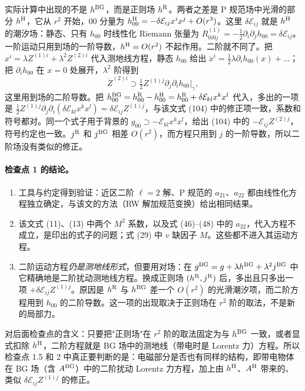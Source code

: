 \documentclass[11pt,a4paper]{ctexart}
\numberwithin{equation}{section}
\begin{document}
实际计算中出现的不是 $h^{\rm BG}$，而是正则场 $h^{\rm R}$。两者之差是 P 规范场中光滑的部分 $h^{\rm H}$，它从 $r^2$ 开始，$00$ 分量为 $h^{\rm H}_{00}=-\delta\mathcal E_{ij}x^ix^j+O(r^3)$。这里 $\delta\mathcal E_{ij}$ 就是 $h^{\rm H}$ 的潮汐场：静态、只有 $h_{00}$ 时线性化 Riemann 张量为 $R^{(1)}_{0i0j}=-\tfrac12\partial_i\partial_jh_{00}=\delta\mathcal E_{ij}$。一阶运动只用到场的一阶导数，$h^{\rm H}=O(r^2)$ 不起作用。二阶就不同了。把 $x^i=\lambda Z^{(1)i}+\lambda^2Z^{(2)i}$ 代入测地线方程，静态 $h_{00}$ 给出 $\ddot x^i=\tfrac12\lambda\partial_ih_{00}(x)+\dots$；把 $\partial_ih_{00}$ 在 $x=0$ 处展开，$\lambda^2$ 阶得到
\begin{equation*}
\ddot Z^{(2)i}\supset\tfrac12Z^{(1)j}\partial_j\partial_ih_{00}\big|_\gamma ,
\end{equation*}
这里用到场的二阶导数。把 $h^{\rm BG}_{00}=h^{\rm R}_{00}-h^{\rm H}_{00}=h^{\rm R}_{00}+\delta\mathcal E_{kl}x^kx^l$ 代入，多出的一项是 $\tfrac12Z^{(1)j}\partial_j\partial_i(\delta\mathcal E_{kl}x^kx^l)=\delta\mathcal E_{ij}Z^{(1)j}$，与该文式 (104) 中的修正项一致，系数和符号都对。同一个式子用于背景的 $g_{00}\supset-\mathcal E_{kl}x^kx^l$，给出 (104) 中的 $-\mathcal E_{ij}Z^{(2)j}$，符号约定也一致。$j^{\rm R}$ 和 $j^{\rm BG}$ 相差 $O(r^2)$，而方程只用到 $j$ 的一阶导数，所以二阶场没有类似的修正。

\paragraph{检查点 1 的结论。}
\begin{enumerate}
\item 工具与约定得到验证：近区二阶 $\ell=2$ 解、P 规范的 $a_{21}$、$a_{22}$ 都由线性化方程独立确定，与该文的方法（RW 解加规范变换）给出相同结果。
\item 该文式 (11)、(13) 中两个 $M^2$ 系数，以及式 (46)--(48) 中的 $a_{22}$，代入方程不成立，是印出的式子的问题；式 (29) 中 $v$ 缺因子 $M$。这些都不进入其运动方程。
\item 二阶运动方程\emph{仍是测地线形式}，但要用对场：在 $g^{\rm BG}=g+\lambda h^{\rm BG}+\lambda^2j^{\rm BG}$ 中它精确地是二阶扰动测地线方程。换成正则场 $(h^{\rm R},j^{\rm R})$ 后，多出且只多出一项 $+\delta\mathcal E_{ij}Z^{(1)j}$。原因是 $h^{\rm R}$ 与 $h^{\rm BG}$ 差一个 $O(r^2)$ 的光滑潮汐项，而二阶方程用到 $h_{00}$ 的二阶导数。这一项的出现取决于正则场在 $r^2$ 阶的取法，不是新的局部力。
\end{enumerate}
对后面检查点的含义：只要把"正则场"在 $r^2$ 阶的取法固定为与 $h^{\rm BG}$ 一致，或者显式扣除 $h^{\rm H}$，二阶方程就是 BG 场中的测地线（带电时是 Lorentz 力）方程。所以检查点 1.5 和 2 中真正要判断的是：电磁部分是否也有同样的结构，即带电物体在 BG 场（含 $A^{\rm BG}$）中的二阶扰动 Lorentz 力方程，加上由 $h^{\rm H}$、$A^{\rm H}$ 带来的、类似 $\delta\mathcal E_{ij}Z^{(1)j}$ 的修正。
\end{document}
